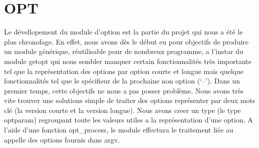 \documentclass[12pt]{article}
\begin{document}

    \section{OPT}
    Le dévellopement du module d'option est la partie du projet qui nous a été 
    le plus chronofage. En effet, nous avons dès le début eu pour objectifs de 
    produire un module générique, réutilisable pour de nombreux programme, a 
    l'instar du module getopt qui nous sembler manquer certain fonctionnalités
    très importante tel que la représentation des options par option courte et 
    longue mais quelque fonctionnalités tel que le spécifieur de la prochaine 
    non option (`--').
    Dans un premier temps, cette objectifs ne nous a pas posser problème. Nous 
    avons très vite trouver une solutions simple de traiter des options 
    représenter par deux mots clé (la version courte et la version longue). Nous 
    avons creer un type (le type optparam) regroupant toute les valeurs utiles 
    a la représentation d'une option. A l'aide d'une fonction opt\_process, le 
    module effectura le traitement liée au appelle des options fournis dans argv.
\end{document}
